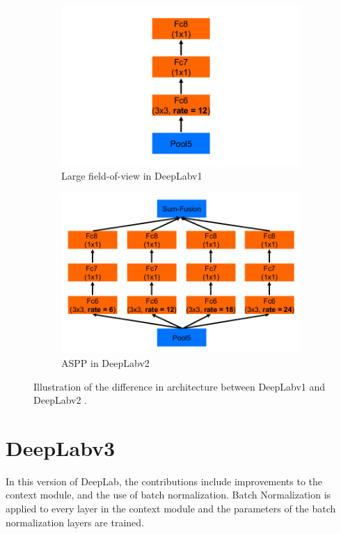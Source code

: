 	\begin{figure}[h]
		\begin{subfigure}{.5\textwidth}
			\centering
			\includegraphics[width=1.03\linewidth]{images/v1_largeFOV}
			\caption{Large field-of-view in DeepLabv1}
		\end{subfigure}
		\begin{subfigure}{.5\textwidth}
			\centering
			\includegraphics[width=1\linewidth]{images/v2_aspp}
			\caption{ASPP in DeepLabv2}
		\end{subfigure}
		\caption{Illustration of the difference in architecture between DeepLabv1 and DeepLabv2 \cite{DBLP:journals/corr/ChenPK0Y16}.}
		\label{Fig:v1vsv2}
	\end{figure}
	
\section{DeepLabv3}
In this version of DeepLab, the contributions include improvements to the context module, and the use of batch normalization. Batch Normalization is applied to every layer in the context module and the parameters of the batch normalization layers are trained.

